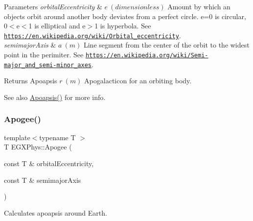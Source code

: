 \begin{DoxyParams}{Parameters}
{\em orbital\+Eccentricity} & $ e\ (dimensionless)$ Amount by which an objects orbit around another body deviates from a perfect circle. e=0 is circular, 0$<$e$<$1 is elliptical and e$>$1 is hyperbola. See \href{https://en.wikipedia.org/wiki/Orbital_eccentricity}{\tt https\+://en.\+wikipedia.\+org/wiki/\+Orbital\+\_\+eccentricity}. \\
\hline
{\em semimajor\+Axis} & $ a\ (m)$ Line segment from the center of the orbit to the widest point in the perimiter. See \href{https://en.wikipedia.org/wiki/Semi-major_and_semi-minor_axes}{\tt https\+://en.\+wikipedia.\+org/wiki/\+Semi-\/major\+\_\+and\+\_\+semi-\/minor\+\_\+axes}. \\
\hline
\end{DoxyParams}
\begin{DoxyReturn}{Returns}
Apoapsis $ r\ (m)$ Apogalacticon for an orbiting body. 
\end{DoxyReturn}
\begin{DoxySeeAlso}{See also}
\mbox{\hyperlink{group___e_g_x_phys-_apoapsis_gaf962e650bf84a568458e8eb39b1c61ba}{Apoapsis()}} for more info. 
\end{DoxySeeAlso}
\mbox{\label{group___e_g_x_phys-_apoapsis_ga5cf587a051db28cae9e028a2b4955b0d}} 
\subsubsection{\texorpdfstring{Apogee()}{Apogee()}}
{\footnotesize\ttfamily template$<$typename T $>$ \\
T E\+G\+X\+Phys\+::\+Apogee (\begin{DoxyParamCaption}\item[{const T \&}]{orbital\+Eccentricity,  }\item[{const T \&}]{semimajor\+Axis }\end{DoxyParamCaption})}



Calculates apoapsis around Earth. 


